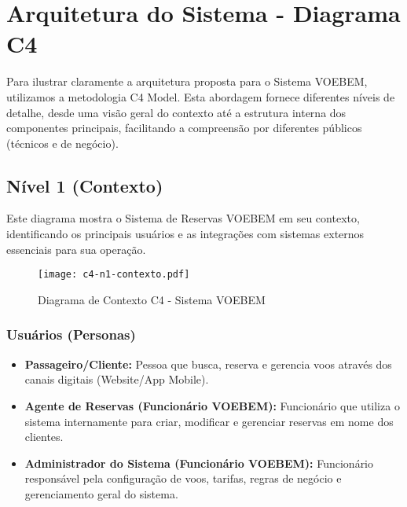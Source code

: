 \chapter{Arquitetura do Sistema - Diagrama C4}
\label{chap:arquitetura-c4}

Para ilustrar claramente a arquitetura proposta para o Sistema VOEBEM, utilizamos a metodologia C4 Model. Esta abordagem fornece diferentes níveis de detalhe, desde uma visão geral do contexto até a estrutura interna dos componentes principais, facilitando a compreensão por diferentes públicos (técnicos e de negócio).

\section{Nível 1 (Contexto)}
\label{sec:c4-contexto}

Este diagrama mostra o Sistema de Reservas VOEBEM em seu contexto, identificando os principais usuários e as integrações com sistemas externos essenciais para sua operação.

\begin{figure}[htbp]
    \centering
    \texttt{[image: c4-n1-contexto.pdf]}
    \caption{Diagrama de Contexto C4 - Sistema VOEBEM}
    \label{fig:c4-contexto}
\end{figure}

\subsection{Usuários (Personas)}
\label{subsec:c4-contexto-usuarios}
\begin{itemize}
    \item \textbf{Passageiro/Cliente:} Pessoa que busca, reserva e gerencia voos através dos canais digitais (Website/App Mobile).
    \item \textbf{Agente de Reservas (Funcionário VOEBEM):} Funcionário que utiliza o sistema internamente para criar, modificar e gerenciar reservas em nome dos clientes.
    \item \textbf{Administrador do Sistema (Funcionário VOEBEM):} Funcionário responsável pela configuração de voos, tarifas, regras de negócio e gerenciamento geral do sistema.
\end{itemize}

